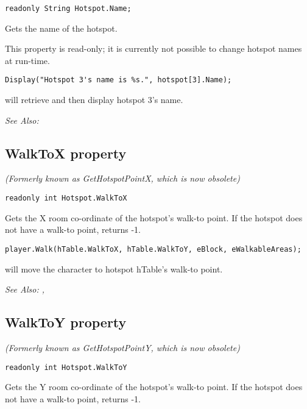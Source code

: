 \begin{verbatim}
readonly String Hotspot.Name;
\end{verbatim}
Gets the name of the hotspot.

This property is read-only; it is currently not possible to change hotspot names at run-time.

\begin{verbatim}
Display("Hotspot 3's name is %s.", hotspot[3].Name);
\end{verbatim}
will retrieve and then display hotspot 3's name.

\it{See Also:} 


\subsection{WalkToX property}\label{Hotspot.WalkToX}%

\it{(Formerly known as GetHotspotPointX, which is now obsolete)}

\begin{verbatim}
readonly int Hotspot.WalkToX
\end{verbatim}
Gets the X room co-ordinate of the hotspot's walk-to point. If the hotspot
does not have a walk-to point, returns -1.

\begin{verbatim}
player.Walk(hTable.WalkToX, hTable.WalkToY, eBlock, eWalkableAreas);
\end{verbatim}
will move the character to hotspot hTable's walk-to point.

\it{See Also:} ,


\subsection{WalkToY property}\label{Hotspot.WalkToY}%

\it{(Formerly known as GetHotspotPointY, which is now obsolete)}

\begin{verbatim}
readonly int Hotspot.WalkToY
\end{verbatim}
Gets the Y room co-ordinate of the hotspot's walk-to point. If the hotspot
does not have a walk-to point, returns -1.

